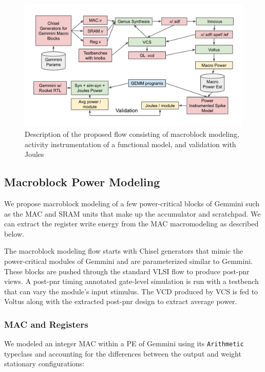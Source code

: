 \documentclass[sigconf]{acmart}
\begin{document}
\begin{figure}
  \begin{center}
    \includegraphics[width=\linewidth]{overall_flow.pdf}
  \end{center}
  \caption{Description of the proposed flow consisting of macroblock modeling, activity instrumentation of a functional model, and validation with Joules}
  \label{fig:overall_flow}
\end{figure}

\subsection{Macroblock Power Modeling}
We propose macroblock modeling of a few power-critical blocks of Gemmini such as the MAC and SRAM units that make up the accumulator and scratchpad.
We can extract the register write energy from the MAC macromodeling as described below.

The macroblock modeling flow starts with Chisel generators that mimic the power-critical modules of Gemmini and are parameterized similar to Gemmini.
These blocks are pushed through the standard VLSI flow to produce post-pnr views.
A post-pnr timing annotated gate-level simulation is run with a testbench that can vary the module's input stimulus.
The VCD produced by VCS is fed to Voltus along with the extracted post-pnr design to extract average power.

\subsubsection{MAC and Registers}
We modeled an integer MAC within a PE of Gemmini using its \texttt{Arithmetic} typeclass and accounting for the differences between the output and weight stationary configurations:
\end{document}
